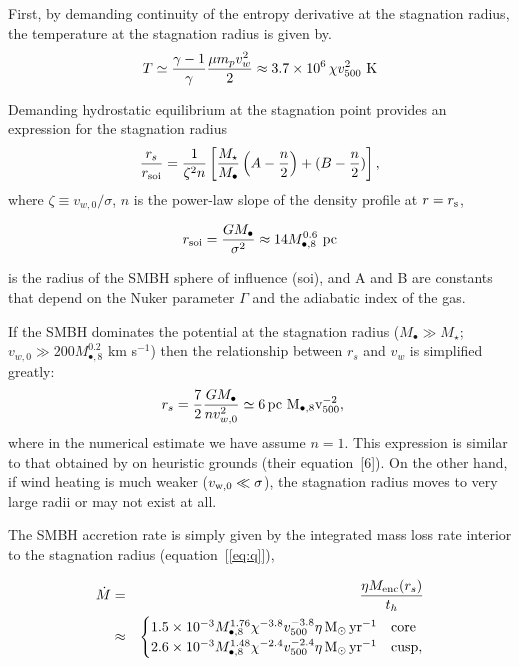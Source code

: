 \documentclass[usenatbib,fleqn]{mn2e}
\newcommand{\rs}{r_s}
\newcommand{\pc}{\rm pc}
\newcommand{\Menc}{M_{\rm enc}}
\newcommand{\Mstar}{M_{\star}}
\newcommand{\Mbh}[1][]{M_{\bullet#1}}
\newcommand{\Mbheight}{M_{\bullet,8}}
\newcommand{\soi}{\rm soi}
\newcommand{\rsoi}{r_{\soi}}
\newcommand{\vwO}{v_{w,0}}
\newcommand{\x}{\frac{r_s}{\rsoi}}
\newcommand{\pyear}{{\rm yr}^{-1}}
\renewcommand{\th}{t_h}
\begin{document}
First, by demanding continuity of the entropy derivative at the stagnation radius, the temperature at the stagnation radius is given by.
\begin{align}
T \simeq \frac{\gamma-1}{\gamma}\frac{\mu m_p v_{w}^{2}}{2} \approx 3.7
\times 10^6\,\chi v_{500}^2 \,\,{\rm K} 
\label{eq:Tanalytic}
\end{align}

Demanding hydrostatic equilibrium at the stagnation point provides an expression for the stagnation radius
\begin{align}
  \x=\frac{1}{\zeta^2 n}\left[
    \frac{\Mstar}{\Mbh}\left(A-\frac{n}{2}\right)+(B-\frac{n}{2})\right],
  \label{eq:stag_analytic}
\end{align}
where $\zeta \equiv v_{w,0}/\sigma$, $n$ is the power-law slope of the
density profile at $r = r_{\rm s}$,

\begin{align}
r_{\rm soi} = \frac{GM_{\bullet}}{\sigma^{2}} \approx 14M_{\bullet,8}^{0.6}\,\,{\rm pc}
\end{align}

is the radius of the SMBH sphere of
influence (soi), and A and B are constants that depend on the Nuker
parameter $\Gamma$ and the adiabatic index of the gas.

If the SMBH dominates the potential at the stagnation radius
($M_{\bullet} \gg M_{\star}$; $v_{w,0} \gg 200 M_{\bullet,8}^{0.2}$ km
s$^{-1}$) then the relationship between $\rs$ and $v_{w}$ is
simplified greatly:
\begin{align}
  &\rs=\frac{7}{2}\frac{G \Mbh}{n \vwO^2} \simeq 6 \, \pc \,\, \Mbheight v_{500}^{-2},
  \label{eq:stag_simple}
\end{align}
where in the numerical estimate we have assume $n = 1$.  This expression is similar to that obtained by \citet{Volonteri+11} on heuristic grounds (their equation~[6]).  On the other hand, if wind heating is much weaker ($v_{\rm w,0} \ll \sigma$), the stagnation radius moves to very large radii or may not exist at all.  

The SMBH accretion rate is simply given by the integrated mass loss
rate interior to the stagnation radius (equation~[\ref{eq:q}]), 

\begin{eqnarray}
  \dot{M} &=& \frac{\eta \Menc(\rs)}{\th} \nonumber \\
&\approx&
  \begin{cases}
    1.5 \times 10^{-3} M_{\bullet,8}^{1.76}
    \chi^{-3.8} v_{500}^{-3.8}  \eta \Msun \, \pyear& \text{core} \\
    2.6 \times 10^{-3} \Mbheight^{1.48} 
    \chi^{-2.4} v_{500}^{-2.4}  \eta \Msun \, \pyear  & \text{cusp}, 
  \end{cases}
  \label{eq:mdot_analytic}
\end{eqnarray}
\end{document}
